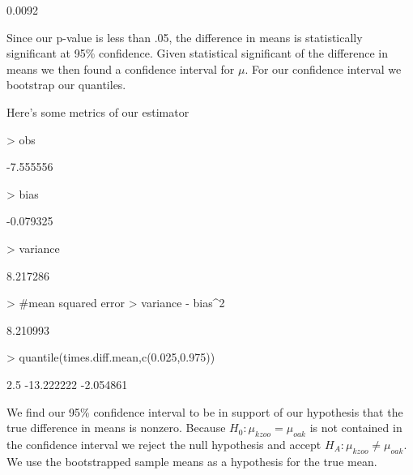 \documentclass{article}
\begin{document}
\begin{Schunk}
\begin{Soutput}
[1] 0.0092
\end{Soutput}
\end{Schunk}

Since our p-value is less than .05, the difference in means is statistically significant at 95\% confidence. Given statistical significant of the difference in means we then found a confidence interval for $\mu$. For our confidence interval we bootstrap our quantiles.

Here's some metrics of our estimator
\begin{Schunk}
\begin{Sinput}
> obs
\end{Sinput}
\begin{Soutput}
[1] -7.555556
\end{Soutput}
\begin{Sinput}
> bias
\end{Sinput}
\begin{Soutput}
[1] -0.079325
\end{Soutput}
\begin{Sinput}
> variance
\end{Sinput}
\begin{Soutput}
[1] 8.217286
\end{Soutput}
\begin{Sinput}
> #mean squared error
> variance - bias^2
\end{Sinput}
\begin{Soutput}
[1] 8.210993
\end{Soutput}
\begin{Sinput}
> quantile(times.diff.mean,c(0.025,0.975))
\end{Sinput}
\begin{Soutput}
      2.5%
-13.222222  -2.054861 
\end{Soutput}
\end{Schunk}

We find our 95\% confidence interval to be in support of our hypothesis that the true difference in means is nonzero. Because $H_0: \mu_{kzoo} = \mu_{oak}$  is not contained in the confidence interval we reject the null hypothesis and accept $H_A: \mu_{kzoo} \ne \mu_{oak}$. We use the bootstrapped sample means as a hypothesis for the true mean.
\end{document}
